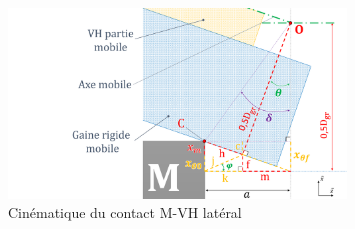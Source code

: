 \begin{figure}[!htb]
\begin{center}
 \captionsetup{justification=centering} 
   \includegraphics[trim={6cm 0cm 0cm 0cm},clip,width=0.8\textwidth]{../Chap6/Figure/cinematique_pliage_VH_lacher_calculs.pdf}
   \caption{Cinématique du contact M-VH latéral}
   \label{fig:cinematique_pliage_VH_lacher}
\end{center}	
\end{figure}    

